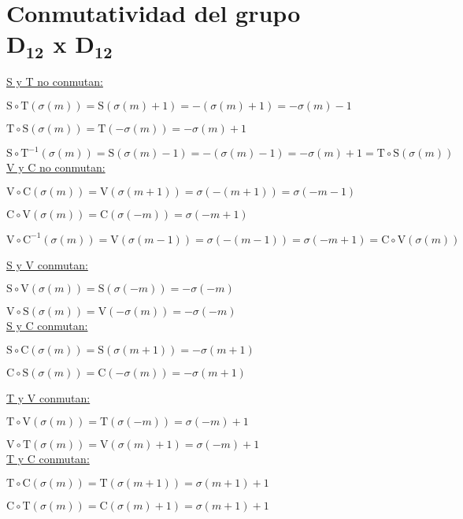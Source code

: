 	\chapter[Conmutatividad del grupo D$_{12}$ x D$_{12}$]{Conmutatividad del grupo \\D$_{\textbf{12}}$ x D$_{\textbf{12}}$}
	\label{app:commm}
		\vspace{-1cm}\underline{S y T no conmutan:}
		
		$\text{S}\circ\text{T}(\sigma(m))=\text{S}(\sigma(m)+1)=-(\sigma(m)+1)=-\sigma(m)-1$
		
		$\text{T}\circ\text{S}(\sigma(m))=\text{T}(-\sigma(m))=-\sigma(m)+1$
		
		$\text{S}\circ\text{T}^{-1}(\sigma(m))=\text{S}(\sigma(m)-1)=-(\sigma(m)-1)=-\sigma(m)+1=\text{T}\circ\text{S}(\sigma(m))$\\
		
		\underline{V y C no conmutan:}
		
		$\text{V}\circ\text{C}(\sigma(m))=\text{V}(\sigma(m+1))=\sigma(-(m+1))=\sigma(-m-1)$
		
		$\text{C}\circ\text{V}(\sigma(m))=\text{C}(\sigma(-m))=\sigma(-m+1)$
		
		$\text{V}\circ\text{C}^{-1}(\sigma(m))=\text{V}(\sigma(m-1))=\sigma(-(m-1))=\sigma(-m+1)=\text{C}\circ\text{V}(\sigma(m))$\\
		
		\begin{multicols}{2}\underline{S y V conmutan:}
		
		$\text{S}\circ\text{V}(\sigma(m))=\text{S}(\sigma(-m))=-\sigma(-m)$
		
		$\text{V}\circ\text{S}(\sigma(m))=\text{V}(-\sigma(m))=-\sigma(-m)$\\
		
		\underline{S y C conmutan:}
		
		$\text{S}\circ\text{C}(\sigma(m))=\text{S}(\sigma(m+1))=-\sigma(m+1)$
		
		$\text{C}\circ\text{S}(\sigma(m))=\text{C}(-\sigma(m))=-\sigma(m+1)$
		
		\underline{T y V conmutan:}
		
		$\text{T}\circ\text{V}(\sigma(m))=\text{T}(\sigma(-m))=\sigma(-m)+1$
		
		$\text{V}\circ\text{T}(\sigma(m))=\text{V}(\sigma(m)+1)=\sigma(-m)+1$\\
		
		\underline{T y C conmutan:}
		
		$\text{T}\circ\text{C}(\sigma(m))=\text{T}(\sigma(m+1))=\sigma(m+1)+1$
		
		$\text{C}\circ\text{T}(\sigma(m))=\text{C}(\sigma(m)+1)=\sigma(m+1)+1$
		\end{multicols}